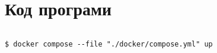 \section{Код програми}

\inputminted[breakanywhere, breaklines]{yaml}{../docker/compose.yml}
\begin{verbatim}
$ docker compose --file "./docker/compose.yml" up
\end{verbatim}

\inputminted[breakanywhere, breaklines]{sql}{../sql/00-initdb.sql}
\inputminted[breakanywhere, breaklines]{sql}{../sql/01-faker.sql}
\inputminted[breakanywhere, breaklines]{shell}{../sql/02-dump.sh.log}
\inputminted[breakanywhere, breaklines]{shell}{../sql/03-roles.sh.log}
